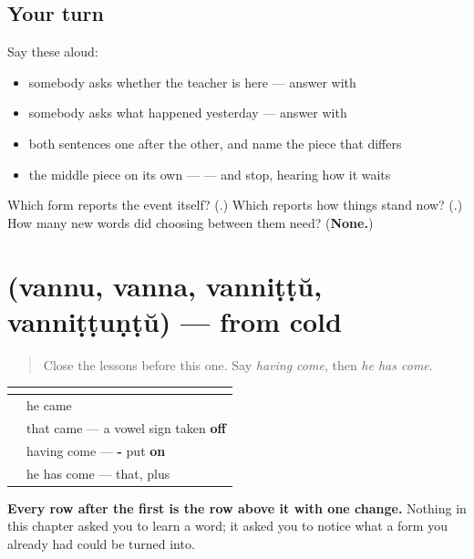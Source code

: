 \subsection*{Your turn}
Say these aloud:

\begin{itemize}
\raggedright
  \item somebody asks whether the teacher is here — answer with \textbf{ }
  \item somebody asks what happened yesterday — answer with \textbf{ }
  \item both sentences one after the other, and name the piece that differs
  \item the middle piece on its own — \textbf{} — and stop, hearing how it waits
\end{itemize}

\begin{tcolorbox}[breakable,colback=teal!4,colframe=teal!35!black,title={Before you move on}]
Which form reports the event itself? (\textbf{}.) Which reports how things stand now? (\textbf{}.) How many new words did choosing between them need? (\textbf{None.})
\end{tcolorbox}
\section[(vannu, vanna, vanniṭṭŭ, vanniṭṭuṇṭŭ)]{(vannu, vanna, vanniṭṭŭ, vanniṭṭuṇṭŭ) — from cold}

\label{lesson:ML-R111-perfect-recall}



\begin{quote}
Close the lessons before this one. Say \emph{having come}, then \emph{he has come}.
\end{quote}

\begin{grammarlens}[title={Grammar Lens: four shapes off one past form}]
\noindent
\begin{tabularx}{\linewidth}{@{}>{\raggedright\arraybackslash}X>{\raggedright\arraybackslash}X@{}}
\toprule
\textbf{} & \textbf{} \\
\midrule
\textbf{\ml{വന്നു}} & he came \\
\textbf{\ml{വന്ന}} & that came — a vowel sign taken \textbf{off} \\
\textbf{\ml{വന്നിട്ട്}} & having come — \textbf{-\ml{ഇട്ട്}} put \textbf{on} \\
\textbf{\ml{വന്നിട്ടുണ്ട്}} & he has come — that, plus \textbf{\ml{ഉണ്ട്}} \\
\bottomrule
\end{tabularx}

\textbf{Every row after the first is the row above it with one change.} Nothing in this chapter asked you to learn a word; it asked you to notice what a form you already had could be turned into.
\end{grammarlens}

